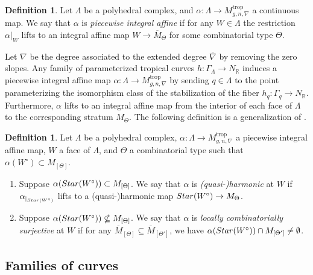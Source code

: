 \documentclass[11pt,reqno]{amsart}
\numberwithin{equation}{section}
\theoremstyle{definition}
\newtheorem{defn}[thm]{Definition}
\newcommand{\trop}{\mathrm{trop}}
\newcommand{\RR}{{\mathbb R}}
\newcommand{\Star}{{\rm Star}}
\def\:{\colon}
\theoremstyle{remark}
\begin{document}
\begin{defn}
Let $\Lambda$ be a polyhedral complex, and $\alpha\:\Lambda\to M_{g, n, \nabla}^\trop$ a continuous map. We say that $\alpha$ is {\em piecewise integral affine} if for any $W\in\Lambda$ the restriction $\alpha|_W$ lifts to an integral affine map $W\to \overline M_\Theta$ for some combinatorial type $\Theta$.
\end{defn}
Let $\nabla$ be the degree associated to the extended degree $\overline\nabla$ by removing the zero slopes. Any family of parameterized tropical curves $h\:\Gamma_\Lambda \to N_\RR$ induces a piecewise integral affine map $\alpha\: \Lambda \to M_{g, n, \nabla}^{\trop}$ by sending $q \in \Lambda$ to the point parameterizing the isomorphism class of the stabilization of the fiber $h_q\: \Gamma_q \to N_\RR$. Furthermore, $\alpha$ lifts to an integral affine map from the interior of each face of $\Lambda$ to the corresponding stratum $M_\Theta$. The following definition is a generalization of \cite[Definition 3.4]{CHT23}.

\begin{defn}\label{def:harloccombsurj}
Let $\Lambda$ be a polyhedral complex, $\alpha\:\Lambda\to M_{g, n, \nabla}^\trop$ a piecewise integral affine map, $W$ a face of $\Lambda$, and $\Theta$ a combinatorial type such that $\alpha(W^\circ)\subset M_{[\Theta]}$.
\begin{enumerate}
 \item Suppose $\alpha(\Star(W^\circ))\subset M_{[\Theta]}$. We say that $\alpha$ is {\em (quasi-)harmonic} at $W$ if $\alpha_{|_{\Star(W^\circ)}}$ lifts to a (quasi-)harmonic map $\Star(W^\circ)\to M_\Theta$.
 \item Suppose $\alpha(\Star(W^\circ))\nsubseteq  M_{[\Theta]}$. We say that $\alpha$ is \textit{locally combinatorially surjective} at $W$ if for any $\overline M_{[\Theta]}\subseteq \overline M_{[\Theta']}$, we have $\alpha(\Star(W^\circ))\cap M_{[\Theta']}\neq \emptyset $.
\end{enumerate}
\end{defn}


\subsection{Families of curves}

\label{subsec: Families of curves}
\end{document}
